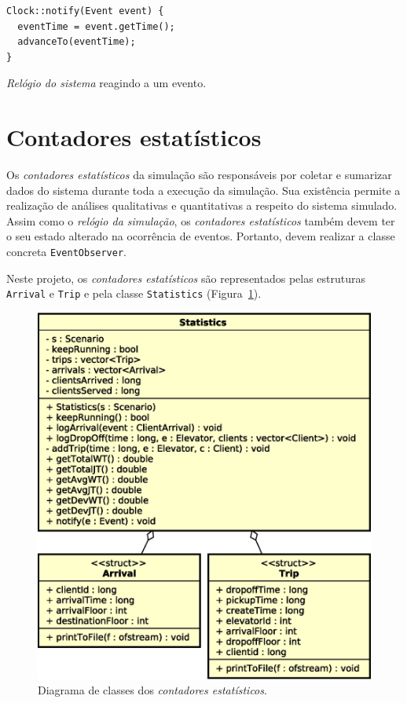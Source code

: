 \begin{algorithm}[htb!]
  \centering
    \begin{verbatim}
Clock::notify(Event event) {
  eventTime = event.getTime();
  advanceTo(eventTime);
}
    \end{verbatim}
  \caption{\label{alg:advanceto}\textit{Relógio do sistema} reagindo a um evento.}
\end{algorithm}

\section{Contadores estatísticos}

Os \textit{contadores estatísticos} da simulação são responsáveis por coletar e
sumarizar dados do sistema durante toda a execução da simulação. Sua existência
permite a realização de análises qualitativas e quantitativas a respeito do
sistema simulado. Assim como o \textit{relógio da simulação}, os
\textit{contadores estatísticos} também devem ter o seu estado alterado na
ocorrência de eventos. Portanto, devem realizar a classe concreta
\texttt{EventObserver}.

Neste projeto, os \textit{contadores estatísticos} são
representados pelas estruturas \texttt{Arrival} e \texttt{Trip} e pela classe
\texttt{Statistics} (Figura~\ref{fig:diagram:statistics}).

\begin{figure}[htb!]
  \centering
  \includegraphics[scale=0.6]{img/Statistics}
  \caption{Diagrama de classes dos \textit{contadores estatísticos}.}
\label{fig:diagram:statistics}
\end{figure}

